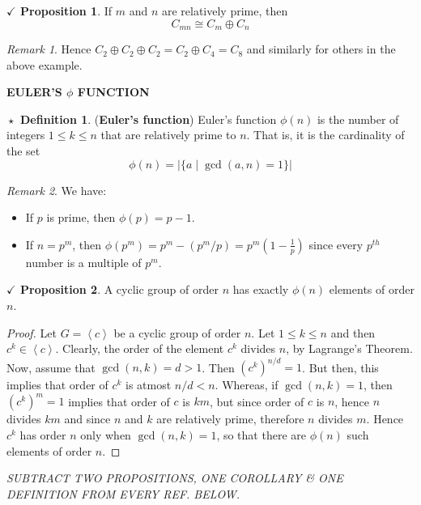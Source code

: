 \documentclass{article}
\theoremstyle{definition}
\newtheorem{definition}{$\boxed{\star}$ Definition}
\theoremstyle{remark}
\newtheorem*{remark}{Remark}
\theoremstyle{definition}
\theoremstyle{definition}
\newtheorem{proposition}{$\checkmark$ Proposition}
\theoremstyle{definition}
\theoremstyle{proof}
\newcommand{\abs}[1]{\left \vert#1\right \vert}
\newcommand{\gen}[1]{\left\langle #1\right\rangle}
\newcommand{\isomorph}{\cong}
\begin{document}
\hrulefill
\begin{proposition}
	If $ m $ and $ n $ are relatively prime, then
	\[C_{mn} \isomorph C_{m}\oplus C_{n}\]
\end{proposition}
\begin{remark}
	Hence $ C_2\oplus C_2 \oplus C_2 = C_2\oplus C_4 = C_8 $ and similarly for others in the above example.
\end{remark}
\newpage
\hrulefill
\textbf{EULER'S $ \phi $ FUNCTION}
\hrulefill
\begin{definition}
	(\textbf{Euler's function}) Euler's function $ \phi(n) $ is the number of integers $ 1\le k\le n $ that are relatively prime to $ n $. That is, it is the cardinality of the set
	\[\phi(n) = \abs{\{a  \;\vert\; \gcd(a,n) = 1\}}\]
\end{definition}
\begin{remark}
	We have:
	\begin{itemize}
		\item {If $ p $ is prime, then $ \phi(p) = p-1 $.}
		\item {If $ n= p^m $, then $ \phi(p^m) = p^m - (p^m/p)  = p^m\left (1-\frac{1}{p}\right )$ since every $ p^{th} $ number is a multiple of $ p^m $.}
	\end{itemize}
\end{remark}
\hrulefill
\begin{proposition}
	A cyclic group of order $ n $ has exactly $ \phi(n) $ elements of order $ n $.
\end{proposition}
\begin{proof}
	Let $ G  = \gen{c}$ be a cyclic group of order $ n $. Let $ 1\le k\le n $ and then $ c^k \in \gen{c} $. Clearly, the order of the element $ c^k $ divides $ n $, by Lagrange's Theorem. Now, assume that $ \gcd(n,k) = d>1 $. Then $ (c^k)^{n/d} = 1$. But then, this implies that order of $ c^k $ is atmost $ n/d < n$. Whereas, if $ \gcd(n,k) = 1 $, then $ (c^k)^m = 1$ implies that order of $ c $ is $ km $, but since order of $ c $ is $ n $, hence $ n $ divides $ km $ and since $ n $ and $ k $ are relatively prime, therefore $ n $ divides $ m $. Hence $ c^k $ has order $ n $ only when $ \gcd(n,k) = 1 $, so that there are $ \phi(n) $ such elements of order $ n $.
\end{proof}
\hrulefill

\emph{SUBTRACT TWO PROPOSITIONS, ONE COROLLARY \& ONE DEFINITION FROM EVERY REF. BELOW.}
\newpage
\end{document}
